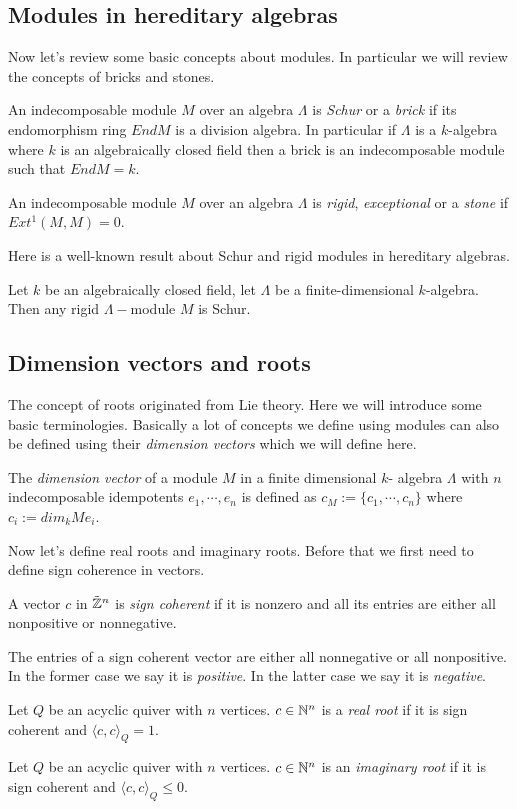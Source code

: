 \subsection{Modules in hereditary algebras}
\indent Now let's review some basic concepts about modules. In particular we will review the concepts of bricks and stones.\\
\begin{definition}
\indent An indecomposable module $M$ over an algebra $\Lambda$ is \textit{Schur} or a \textit{brick} if its endomorphism ring $End M$ is a division algebra. In particular if $\Lambda$ is a $k$-algebra where $k$ is an algebraically closed field then a brick is an indecomposable module such that $End M=k$.
\end{definition}
\begin{definition}
\indent An indecomposable module $M$ over an algebra $\Lambda$ is \textit{rigid}, \textit{exceptional} or a \textit{stone} if $Ext^1 (M,M)=0$.
\end{definition}
\indent Here is a well-known result about Schur and rigid modules in hereditary algebras.
\begin{theorem}
\indent \cite{ASS06}Let $k$ be an algebraically closed field, let $\Lambda$ be a finite-dimensional $k$-algebra. Then any rigid $\Lambda-$module $M$ is Schur.
\end{theorem}
\subsection{Dimension vectors and roots}
\indent The concept of roots originated from Lie theory. Here we will introduce some basic terminologies. Basically a lot of concepts we define using modules can also be defined using their \textit{dimension vectors} which we will define here.\\
\begin{definition}
The \textit{dimension vector} of a module $M$ in a finite dimensional $k$- algebra $\Lambda$ with $n$ indecomposable idempotents $e_1,\cdots, e_n$ is defined as $c_M:=\{c_1,\cdots, c_n\}$ where $c_i:= dim_k Me_i$.
\end{definition}
\indent Now let's define real roots and imaginary roots. Before that we first need to define sign coherence in vectors.\\
\begin{definition}
A vector $c$ in $\tilde{\mathbb{Z}}^n$ is \textit{sign coherent} if it is nonzero and all its entries are either all nonpositive or nonnegative.
\end{definition}
\indent The entries of a sign coherent vector are either all nonnegative or all nonpositive. In the former case we say it is \textit{positive}. In the latter case we say it is \textit{negative}.\\
\begin{definition}
Let $Q$ be an acyclic quiver with $n$ vertices. $c\in \mathbb{N}^n$ is a \textit{real root} if it is sign coherent and $\langle c, c\rangle_Q = 1$.
\end{definition}
\begin{definition}
Let $Q$ be an acyclic quiver with $n$ vertices. $c\in \mathbb{N}^n$ is an \textit{imaginary root} if it is sign coherent and $\langle c, c\rangle_Q \leq 0$.
\end{definition}
